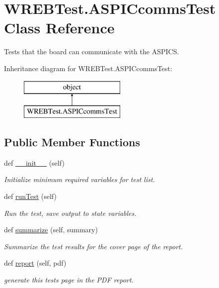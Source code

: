 \hypertarget{class_w_r_e_b_test_1_1_a_s_p_i_ccomms_test}{}\section{W\+R\+E\+B\+Test.\+A\+S\+P\+I\+Ccomms\+Test Class Reference}
\label{class_w_r_e_b_test_1_1_a_s_p_i_ccomms_test}


Tests that the board can communicate with the A\+S\+P\+I\+CS.  


Inheritance diagram for W\+R\+E\+B\+Test.\+A\+S\+P\+I\+Ccomms\+Test\+:\begin{figure}[H]
\begin{center}
\leavevmode
\includegraphics[height=2.000000cm]{class_w_r_e_b_test_1_1_a_s_p_i_ccomms_test}
\end{center}
\end{figure}
\subsection*{Public Member Functions}
\begin{DoxyCompactItemize}
\item 
def \hyperlink{class_w_r_e_b_test_1_1_a_s_p_i_ccomms_test_accfa18c4f22917c2d1ed89b083f02615}{\+\_\+\+\_\+init\+\_\+\+\_\+} (self)
\begin{DoxyCompactList}\small\item\em Initialize minimum required variables for test list. \end{DoxyCompactList}\item 
def \hyperlink{class_w_r_e_b_test_1_1_a_s_p_i_ccomms_test_ab1d5e43e09a6ba9656a27631614cd268}{run\+Test} (self)
\begin{DoxyCompactList}\small\item\em Run the test, save output to state variables. \end{DoxyCompactList}\item 
def \hyperlink{class_w_r_e_b_test_1_1_a_s_p_i_ccomms_test_a359865f04f303787eb68e5f29409a768}{summarize} (self, summary)
\begin{DoxyCompactList}\small\item\em Summarize the test results for the cover page of the report. \end{DoxyCompactList}\item 
def \hyperlink{class_w_r_e_b_test_1_1_a_s_p_i_ccomms_test_a3eec1ad1eae7096b587d081db36b85b6}{report} (self, pdf)
\begin{DoxyCompactList}\small\item\em generate this test\textquotesingle{}s page in the P\+DF report. \end{DoxyCompactList}\end{DoxyCompactItemize}


